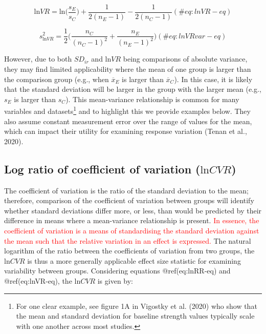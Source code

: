 \documentclass[
]{article}
\begin{document}
\begin{equation}
\textrm{ln}VR=\textrm{ln}\biggl(\frac{s_{E}}{s_{C}}\biggl)+\frac{1}{2(n_{E}-1)}-\frac{1}{2(n_{C}-1)}
(\#eq:lnVR-eq)
\end{equation}

\begin{equation}
s^2_{\textrm{ln}VR}=\frac{1}{2}\biggl(\frac{n_{C}}{(n_{C}-1)^2}+\frac{n_{E}}{(n_{E}-1)^2}\biggl)
(\#eq:lnVRvar-eq)
\end{equation}

However, due to both \(SD_{ir}\) and \(\textrm{ln}VR\) being comparisons of absolute variance, they may find limited applicability where the mean of one group is larger than the comparison group (e.g., when \(\overline{x}_E\) is larger than \(\overline{x}_C\)). In this case, it is likely that the standard deviation will be larger in the group with the larger mean (e.g., \(s_{E}\) is larger than \(s_{C}\)). This mean-variance relationship is common for many variables and datasets\footnote{For one clear example, see figure 1A in Vigostky et al. (2020) who show that the mean and standard deviation for baseline strength values typically scale with one another across most studies.} and to highlight this we provide examples below. They also assume constant measurement error over the range of values for the mean, which can impact their utility for examining response variation (Tenan et al., 2020).

\hypertarget{log-ratio-of-coefficient-of-variation-textrmlncvr}{%
\subsection{\texorpdfstring{Log ratio of coefficient of variation (\(\textrm{ln}CVR\))}{Log ratio of coefficient of variation (\textbackslash textrm\{ln\}CVR)}}\label{log-ratio-of-coefficient-of-variation-textrmlncvr}}

The coefficient of variation is the ratio of the standard deviation to the mean; therefore, comparison of the coefficient of variation between groups will identify whether standard deviations differ more, or less, than would be predicted by their difference in means where a mean-variance relationship is present. \textcolor{red}{In essence, the coefficient of variation is a means of standardising the standard deviation against the mean such that the relative variation in an effect is expressed.} The natural logarithm of the ratio between the coefficients of variation from two groups, the \(\textrm{ln}CVR\) is thus a more generally applicable effect size statistic for examining variability between groups. Considering equations @ref(eq:lnRR-eq) and @ref(eq:lnVR-eq), the \(\textrm{ln}CVR\) is given by:
\end{document}
